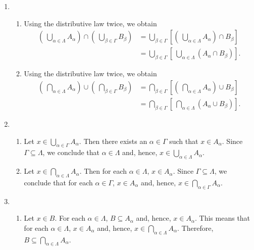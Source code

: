 \begin{enumerate}
\item \begin{enumerate}
\item Using the distributive law twice, we obtain
\begin{align*}
\left(\: \bigcup\limits_{\alpha \in \Lambda}^{}A_\alpha\right) \cap \left(\: \bigcup\limits_{\beta \in \Gamma}^{}B_\beta \right) &= \bigcup\limits_{\beta \in \Gamma}^{} \left[ \left(\: \bigcup\limits_{\alpha \in \Lambda}^{}A_\alpha\right) \cap B_{\beta} \right] \\ &= 
\bigcup\limits_{\beta \in \Gamma}^{} \left[\: \bigcup\limits_{\alpha \in \Lambda}^{} \left(A_{\alpha} \cap B_{\beta} \right) \right].
\end{align*}

\item Using the distributive law twice, we obtain
\begin{align*}
\left(\: \bigcap\limits_{\alpha \in \Lambda}^{}A_\alpha\right) \cup \left(\: \bigcap\limits_{\beta \in \Gamma}^{}B_\beta \right) &= \bigcap\limits_{\beta \in \Gamma}^{} \left[ \left(\: \bigcap\limits_{\alpha \in \Lambda}^{}A_\alpha\right) \cup B_{\beta} \right] \\ &= 
\bigcap\limits_{\beta \in \Gamma}^{} \left[\: \bigcap\limits_{\alpha \in \Lambda}^{} \left(A_{\alpha} \cup B_{\beta} \right) \right].
\end{align*}
\end{enumerate}


\item \begin{enumerate}
\item Let $x \in \bigcup\limits_{\alpha \in \Gamma}^{}A_\alpha$.  Then there exists an 
$\alpha \in \Gamma$ such that $x \in A_{\alpha}$.  Since $\Gamma \subseteq \Lambda$, we conclude that $\alpha \in \Lambda$ and, hence, $x \in \bigcup\limits_{\alpha \in \Lambda}^{}A_\alpha$.

\item Let $x \in \bigcap\limits_{\alpha \in \Lambda}^{}A_\alpha$.  Then for each  
$\alpha \in \Lambda$, $x \in A_{\alpha}$.  Since $\Gamma \subseteq \Lambda$, we conclude that 
for each $\alpha \in \Gamma$, $x \in A_{\alpha}$ and, hence, 
$x \in \bigcap \limits_{\alpha \in \Gamma}^{}A_\alpha$.
\end{enumerate}



\item \begin{enumerate}
\item Let $x \in B$.  For each $\alpha \in \Lambda$, $B \subseteq A_\alpha$ and, hence, 
$x \in A_\alpha$.  This means that for each 
$\alpha \in \Lambda$, $x \in A_\alpha$  and, hence, 
$x \in \bigcap\limits_{\alpha \in \Lambda}^{}A_\alpha$.  Therefore, 
$B \subseteq \bigcap\limits_{\alpha \in \Lambda}^{}A_\alpha$.


\end{enumerate}
\end{enumerate}
